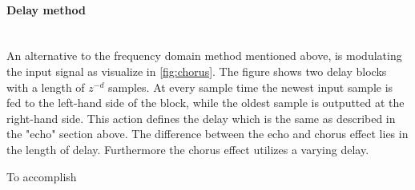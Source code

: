 \paragraph{Delay method}\mbox{}\\
  

An alternative to the frequency domain method mentioned above, is modulating the input signal as visualize in \cref{fig:chorus}. The figure shows two delay blocks with a length of $z^{-d}$ samples. At every sample time the newest input sample is fed to the left-hand side of the block, while the oldest sample is outputted at the right-hand side. This action defines the delay which is the same as described in the "echo" section above. The difference between the echo and chorus effect lies in the length of delay. Furthermore the chorus effect utilizes a varying delay.

To accomplish         

